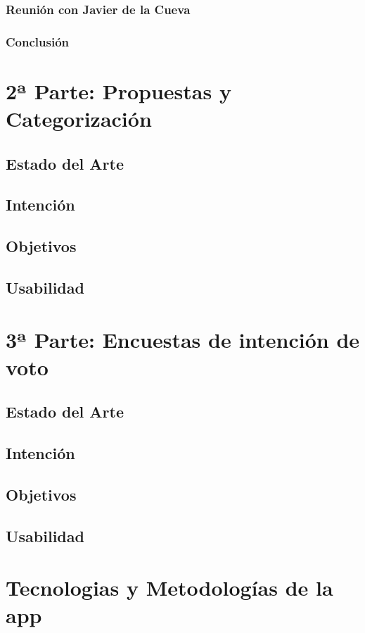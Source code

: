 	\subsubsection{Reunión con Javier de la Cueva}
	
	\subsubsection{Conclusión}

  
\section{2ª Parte: Propuestas y Categorización}
  \subsection{Estado del Arte}

  \subsection{Intención}
  \subsection{Objetivos}
  \subsection{Usabilidad}
  
\section{3ª Parte: Encuestas de intención de voto}
  \subsection{Estado del Arte}

  \subsection{Intención}
  \subsection{Objetivos}
  \subsection{Usabilidad}
  
  
\section{Tecnologias y Metodologías de la app}

